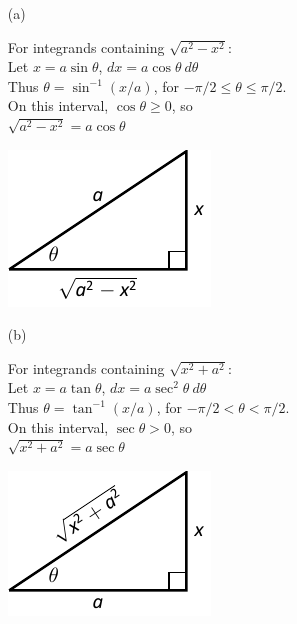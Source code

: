 \setboxwidth{100pt}
\hskip-100pt%
\noindent\begin{minipage}{\linewidth+100pt}
{\begin{enumerate}
	\item[(a)] \noindent%
		\begin{minipage}[t]{.6\linewidth}%
		For integrands containing $\sqrt{a^2-x^2}$:\\[5pt]
		Let $x=a\sin\theta$, \qquad $dx = a\cos\theta\ d\theta$\\[5pt]	
	Thus $\theta = \sin^{-1}(x/a)$, for $-\pi/2\leq \theta\leq \pi/2$. \\[5pt]	
	On this interval, $\cos\theta\geq 0$, so\\[5pt]	
	$\sqrt{a^2-x^2} = a\cos\theta$
		\end{minipage}\qquad
	\begin{minipage}[t]{.4\linewidth}\vskip 0pt
		\includegraphics{figures/figtrigsub_intro1}
		\end{minipage}
		
	\item[(b)] \noindent
	\begin{minipage}[t]{.6\linewidth}
		For integrands containing $\sqrt{x^2+a^2}$:\\[5pt]
		Let $x=a\tan\theta$, \qquad $dx = a\sec^2\theta\ d\theta$\\[5pt]	
	Thus $\theta = \tan^{-1}(x/a)$, for $-\pi/2 < \theta < \pi/2$. \\[5pt]	
	On this interval, $\sec\theta> 0$, so\\[5pt]	
	$\sqrt{x^2+a^2} = a\sec\theta$
		\end{minipage}\qquad
	\begin{minipage}[t]{.4\linewidth}\vskip 0pt
		\includegraphics{figures/figtrigsub_intro3}
		\end{minipage}
		

\end{enumerate}}
\end{minipage}
